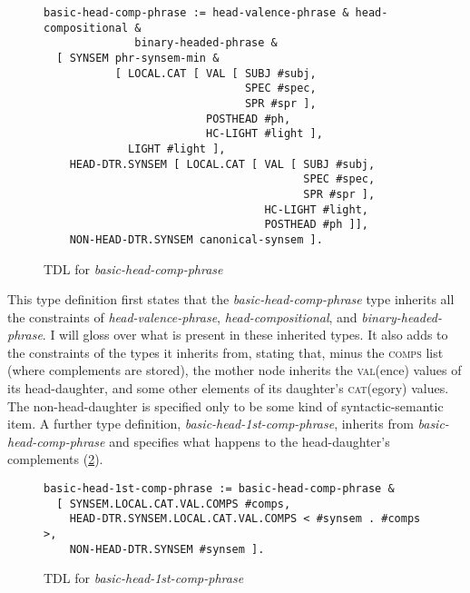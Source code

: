 \begin{figure}[H]
\caption{TDL for \textit{basic-head-comp-phrase}}
\label{figure:basic-head-comp-phrase}
\begin{singlespacing}
\begin{verbatim}
basic-head-comp-phrase := head-valence-phrase & head-compositional &
              binary-headed-phrase &
  [ SYNSEM phr-synsem-min &
           [ LOCAL.CAT [ VAL [ SUBJ #subj,
                               SPEC #spec,
                               SPR #spr ],
                         POSTHEAD #ph,
                         HC-LIGHT #light ],
             LIGHT #light ],
    HEAD-DTR.SYNSEM [ LOCAL.CAT [ VAL [ SUBJ #subj,
                                        SPEC #spec,
                                        SPR #spr ],
                                  HC-LIGHT #light,
                                  POSTHEAD #ph ]],
    NON-HEAD-DTR.SYNSEM canonical-synsem ].
\end{verbatim}
\end{singlespacing}
\end{figure}

\vspace{-5pt}

This type definition first states that the \textit{basic-head-comp-phrase} type inherits all the constraints of \textit{head-valence-phrase}, \textit{head-compositional}, and \textit{binary-headed-phrase}. I will gloss over what is present in these inherited types. It also adds to the constraints of the types it inherits from, stating that, minus the \textsc{comps} list (where complements are stored), the mother node inherits the \textsc{val}(ence) values of its head-daughter, and some other elements of its daughter's \textsc{cat}(egory) values. The non-head-daughter is specified only to be some kind of syntactic-semantic item. A further type definition, \textit{basic-head-1st-comp-phrase}, inherits from \textit{basic-head-comp-phrase} and specifies what happens to the head-daughter's complements (\cref{figure:basic-head-1st-comp-phrase}).

\begin{figure}[H]
\caption{TDL for \textit{basic-head-1st-comp-phrase}}
\label{figure:basic-head-1st-comp-phrase}
\begin{verbatim}
basic-head-1st-comp-phrase := basic-head-comp-phrase &
  [ SYNSEM.LOCAL.CAT.VAL.COMPS #comps,
    HEAD-DTR.SYNSEM.LOCAL.CAT.VAL.COMPS < #synsem . #comps >,
    NON-HEAD-DTR.SYNSEM #synsem ].
\end{verbatim}
\end{figure}

